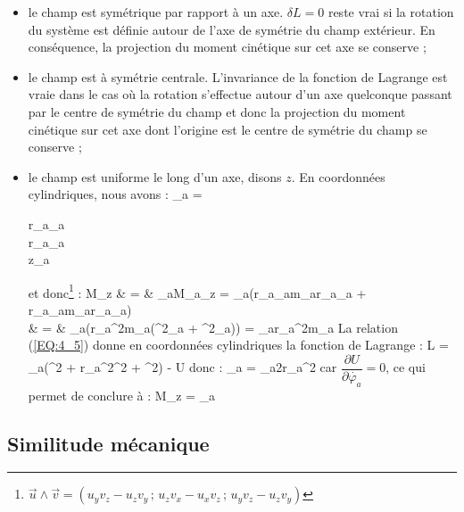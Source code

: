 \begin{itemize}
	\item le champ est sym\'etrique par rapport \`a un axe. $\delta L = 0$ reste vrai si la rotation du syst\`eme est d\'efinie autour de l'axe de sym\'etrie du champ ext\'erieur. En cons\'equence, la projection du moment cin\'etique sur cet axe se conserve ;
	\item le champ est \`a sym\'etrie centrale. L'invariance de la fonction de Lagrange est vraie dans le cas o\`u la rotation s'effectue autour d'un axe quelconque passant par le centre de sym\'etrie du champ et donc la projection du moment cin\'etique sur cet axe dont l'origine est le centre de sym\'etrie du champ se conserve ;
	\item le champ est uniforme le long d'un axe, disons $z$. En coordonn\'ees cylindriques, nous avons :
	\be
		_{a} = \begin{pmatrix} r_{a}\cos\varphi_{a} \\ r_{a}\sin\varphi_{a} \\ z_{a} \end{pmatrix}
	\ee
	et donc\footnote{$\vec{u}\wedge\vec{v} = (u_{y}v_{z}-u_{z}v_{y}\,;\,u_{z}v_{x}-u_{x}v_{z}\,;\,u_{y}v_{z}-u_{z}v_{y})$} :
	\bea
		M_{z} & = & \sum_{a}{M_{a}}_{z} = \sum_{a}\left(r_{a}\cos\varphi_{a}m_{a}r_{a}\cos\varphi_{a} + r_{a}\sin\varphi_{a}m_{a}r_{a}\sin\varphi_{a}\right) \nonumber \\
		& = & \sum_{a}\left(r_{a}^{2}m_{a}(\cos^{2}\varphi_{a} + \sin^{2}\varphi_{a})\right) = \sum_{a}r_{a}^{2}m_{a} \label{EQ:9_8}
	\eea
	La relation (\ref{EQ:4_5}) donne en coordonn\'ees cylindriques la fonction de Lagrange :
	\be
		L = \sum_{a}(^{2} + r_{a}^{2}^{2} + ^{2}) - U
	\ee
	donc :
	\be
		\sum_{a} = \sum_{a}2r_{a}^{2}
	\ee
	car $\dfrac{\partial U}{\partial \dot{\varphi_{a}}} = 0$, ce qui permet de conclure \`a :
	\be
		M_{z} = \sum_{a} \label{EQ:9_7}
	\ee
\end{itemize}

\subsection{Similitude m\'ecanique}

